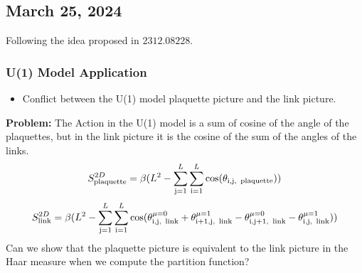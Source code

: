 \begin{center}
\section*{\creationmonth}
\end{center}

\subsection*{March 25, 2024}
Following the idea proposed in $2312.08228$. 
\subsubsection*{U(1) Model Application}
\begin{itemize}
    \item Conflict between the U(1) model plaquette picture and the link picture.
\end{itemize}

\textbf{Problem:} 
The Action in the U(1) model is a sum of cosine of the angle of the plaquettes, but in the link picture  it is the cosine of the sum of the angles of the links.
\begin{equation}
    S_{\text{plaquette}}^{2D} = \beta(L^2- \sum_{\text{j}=1}^{L}\sum_{\text{i}=1}^{L} \cos(\theta_{\text{i,j, \,plaquette}}))
\end{equation}
\begin{equation}
    S_{\text{link}}^{2D} = \beta(L^2- \sum_{\text{j}=1}^{L}\sum_{\text{i}=1}^{L}\cos(\theta_{\text{i,j, \,link}}^{\mu=0}+\theta_{\text{i+1,j, \,link}}^{\mu=1}-\theta_{\text{i,j+1, \,link}}^{\mu=0}-\theta_{\text{i,j, \,link}}^{\mu=1}))
\end{equation}
Can we show that the plaquette picture is equivalent to the link picture in the Haar measure when we compute the partition function?

